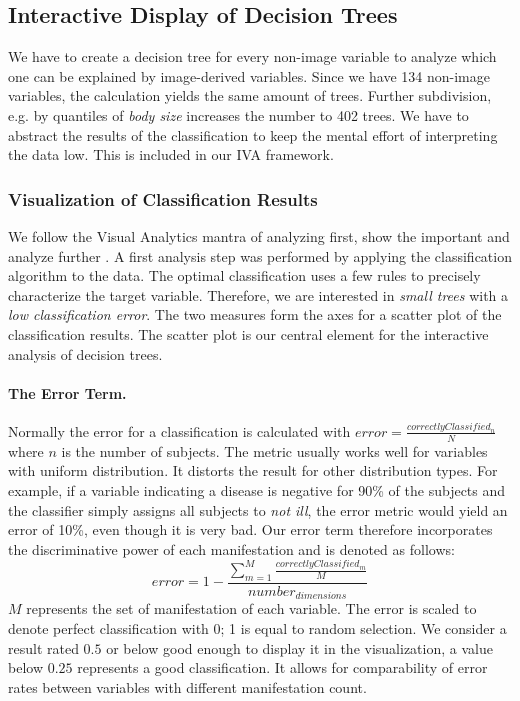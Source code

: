 \documentclass[a4paper,twoside]{style/article}
\begin{document}
\subsection{Interactive Display of Decision Trees}
We have to create a decision tree for every non-image variable to analyze which one can be explained by image-derived variables.
Since we have 134 non-image variables, the calculation yields the same amount of trees.
Further subdivision, e.g. by quantiles of \emph{body size} increases the number to 402 trees.
We have to abstract the results of the classification to keep the mental effort of interpreting the data low.
This is included in our IVA framework.
\subsubsection{Visualization of Classification Results}
\label{subsec:VisualizationOfClassificationResults}
We follow the Visual Analytics mantra of analyzing first, show the important and analyze further \cite{Keim}.
A first analysis step was performed by applying the classification algorithm to the data.
The optimal classification uses a few rules to precisely characterize the target variable.
Therefore, we are interested in \emph{small trees} with a \emph{low classification error}.
The two measures form the axes for a scatter plot of the classification results.
The scatter plot is our central element for the interactive analysis of decision trees.

\paragraph{The Error Term. }
Normally the error for a classification is calculated with $error = \frac{correctlyClassified_{n}} {N}$ where $n$ is the number of subjects.
The metric usually works well for variables with uniform distribution.
It distorts the result for other distribution types.
For example, if a variable indicating a disease is negative for 90\% of the subjects and the classifier simply assigns all subjects to \emph{not ill}, the error metric would yield an error of 10\%, even though it is very bad.
Our error term therefore incorporates the discriminative power of each manifestation and is denoted as follows:
\begin{equation}
error = 1 - \frac{\sum_{m=1}^M \frac{correctlyClassified_{m}}{M}}{number_{dimensions}}
\end{equation}
$M$ represents the set of manifestation of each variable.
The error is scaled to denote perfect classification with 0; 1 is equal to random selection.
We consider a result rated $0.5$ or below good enough to display it in the visualization, a value below $0.25$ represents a good classification.
It allows for comparability of error rates between variables with different manifestation count.
\end{document}
